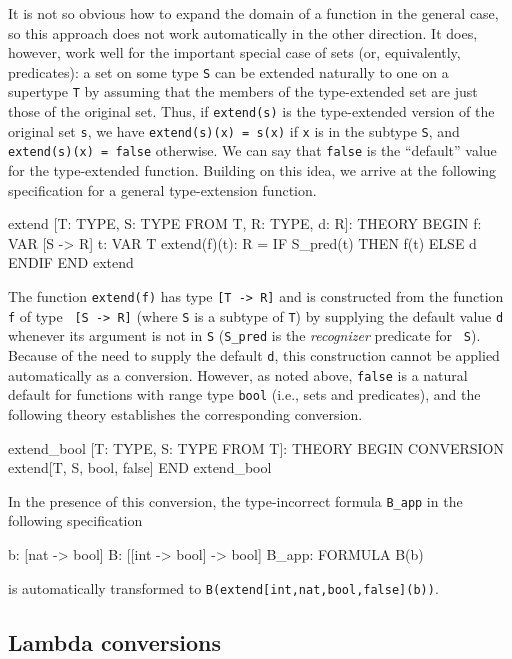 It is not so obvious how to expand the domain of a function in the general
case, so this approach does not work automatically in the other direction.
It does, however, work well for the important special case of sets (or,
equivalently, predicates): a set on some type \texttt{S} can be extended
naturally to one on a supertype \texttt{T} by assuming that the members of
the type-extended set are just those of the original set.  Thus, if
\texttt{extend(s)} is the type-extended version of the original set
\texttt{s}, we have \texttt{extend(s)(x) = s(x)} if \texttt{x} is in the
subtype \texttt{S}, and \texttt{extend(s)(x) = false} otherwise.  We can
say that \texttt{false} is the ``default'' value for the type-extended
function.  Building on this idea, we arrive at the following specification
for a general type-extension function.
\begin{session}
  extend [T: TYPE, S: TYPE FROM T, R: TYPE, d: R]: THEORY
   BEGIN
    f: VAR [S -> R]
    t: VAR T
    extend(f)(t): R = IF S_pred(t) THEN f(t) ELSE d ENDIF
   END extend
\end{session}
The function \texttt{extend(f)} has type \texttt{[T -> R]} and is
constructed from the function \texttt{f} of type \texttt{ [S -> R]} (where
\texttt{S} is a subtype of \texttt{T}) by supplying the default value
\texttt{d} whenever its argument is not in \texttt{S} (\texttt{S\_pred} is
the {\em recognizer\/} predicate for \texttt{ S}).  Because of the need to
supply the default \texttt{d}, this construction cannot be applied
automatically as a conversion.  However, as noted above, \texttt{false} is
a natural default for functions with range type \texttt{bool} (i.e., sets
and predicates), and the following theory establishes the corresponding
conversion.
\begin{session}
extend_bool [T: TYPE, S: TYPE FROM T]: THEORY
 BEGIN
  CONVERSION extend[T, S, bool, false]
 END extend_bool
\end{session}
In the presence of this conversion, the type-incorrect formula
\texttt{B\_app} in the following specification
\begin{pvsex}
  b: [nat -> bool]
  B: [[int -> bool] -> bool]
  B_app: FORMULA B(b)
\end{pvsex}
is automatically transformed to \texttt{B(extend[int,nat,bool,false](b))}.

\subsection{Lambda conversions}\label{lambda-conversion}

